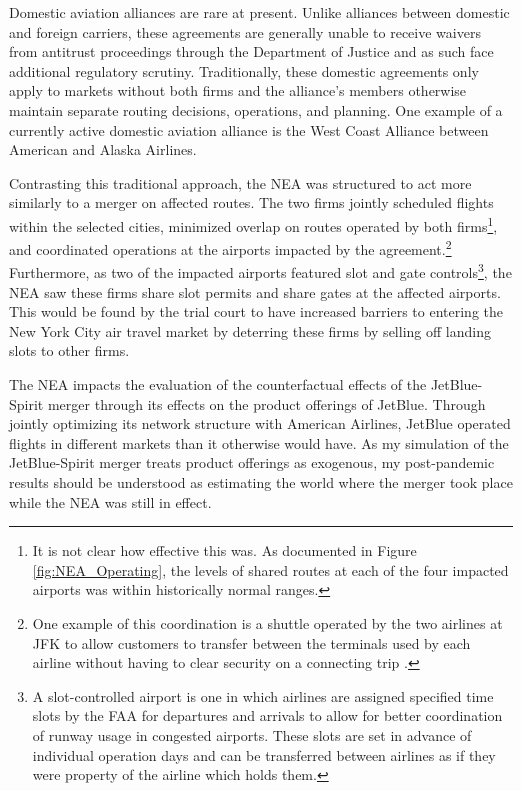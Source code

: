 \documentclass{article}
\begin{document}
	Domestic aviation alliances are rare at present. Unlike alliances between domestic and foreign carriers, these agreements are generally unable to receive waivers from antitrust proceedings through the Department of Justice and as such face additional regulatory scrutiny. Traditionally, these domestic agreements only apply to markets without both firms and the alliance's members otherwise maintain separate routing decisions, operations, and planning. One example of a currently active domestic aviation alliance is the West Coast Alliance between American and Alaska Airlines.  
	
	Contrasting this traditional approach, the NEA was structured to act more similarly to a merger on affected routes. The two firms jointly scheduled flights within the selected cities, minimized overlap on routes operated by both firms\footnote{It is not clear how effective this was. As documented in Figure \ref{fig:NEA_Operating}, the levels of shared routes at each of the four impacted airports was within historically normal ranges.}, and coordinated operations at the airports impacted by the agreement.\footnote{One example of this coordination is a shuttle operated by the two airlines at JFK to allow customers to transfer between the terminals used by each airline without having to clear security on a connecting trip \citep{griff_riding_2021}.} Furthermore, as two of the impacted airports featured slot and gate controls\footnote{A slot-controlled airport is one in which airlines are assigned specified time slots by the FAA for departures and arrivals to allow for better coordination of runway usage in congested airports. These slots are set in advance of individual operation days and can be transferred between airlines as if they were property of the airline which holds them.}, the NEA saw these firms share slot permits and share gates at the affected airports. This would be found by the trial court to have increased barriers to entering the New York City air travel market by deterring these firms by selling off landing slots to other firms. 
    
    The NEA impacts the evaluation of the counterfactual effects of the JetBlue-Spirit merger through its effects on the product offerings of JetBlue. Through jointly optimizing its network structure with American Airlines, JetBlue operated flights in different markets than it otherwise would have. As my simulation of the JetBlue-Spirit merger treats product offerings as exogenous, my post-pandemic results should be understood as estimating the world where the merger took place while the NEA was still in effect. 
\end{document}
